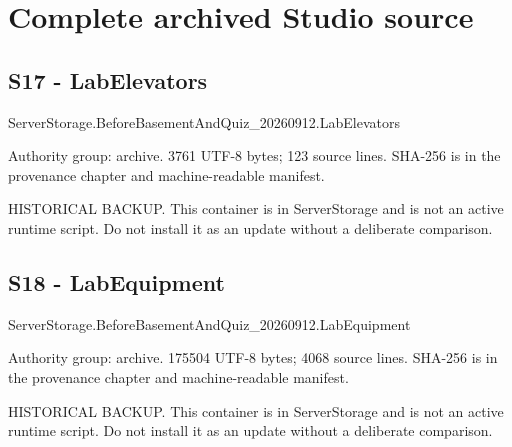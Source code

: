 \begingroup{}
\endgroup
\part{Complete archived Studio source}
\chapter{S17 - LabElevators}
\label{src:S17}
ServerStorage.\allowbreak{}BeforeBasementAndQuiz\_\allowbreak{}20260912.\allowbreak{}LabElevators

Authority group: archive.\allowbreak{} 3761 UTF-8 bytes; 123 source lines.\allowbreak{} SHA-256 is in the provenance chapter and machine-readable manifest.\allowbreak{}

HISTORICAL BACKUP.\allowbreak{} This container is in ServerStorage and is not an active runtime script.\allowbreak{} Do not install it as an update without a deliberate comparison.\allowbreak{}

\begingroup{}
\endgroup
\chapter{S18 - LabEquipment}
\label{src:S18}
ServerStorage.\allowbreak{}BeforeBasementAndQuiz\_\allowbreak{}20260912.\allowbreak{}LabEquipment

Authority group: archive.\allowbreak{} 175504 UTF-8 bytes; 4068 source lines.\allowbreak{} SHA-256 is in the provenance chapter and machine-readable manifest.\allowbreak{}

HISTORICAL BACKUP.\allowbreak{} This container is in ServerStorage and is not an active runtime script.\allowbreak{} Do not install it as an update without a deliberate comparison.\allowbreak{}

\begingroup{}
\endgroup
